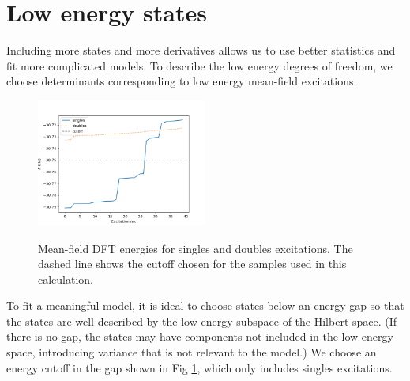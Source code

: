 \section {Low energy states}

Including more states and more derivatives allows us to use better statistics and fit more complicated models.
To describe the low energy degrees of freedom, we choose determinants corresponding to low energy mean-field excitations.

\begin{figure}
\includegraphics[width=0.5\textwidth]{images/determinant_mf_energies.png}
\label{fig:energy_cutoff}
\caption{Mean-field DFT energies for singles and doubles excitations.
The dashed line shows the cutoff chosen for the samples used in this calculation.}
\end{figure}

To fit a meaningful model, it is ideal to choose states below an energy gap so that the states are well described by the low energy subspace of the Hilbert space.
(If there is no gap, the states may have components not included in the low energy space, introducing variance that is not relevant to the model.)
We choose an energy cutoff in the gap shown in Fig \ref{fig:energy_cutoff}, which only includes singles excitations.





